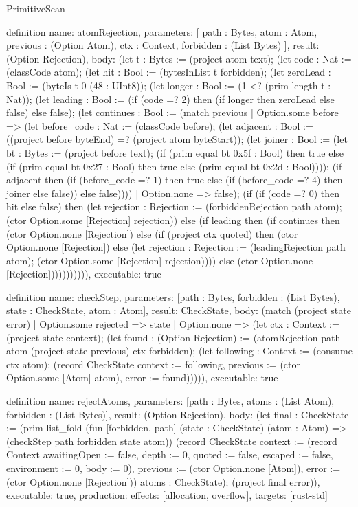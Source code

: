 \begin{lexlean}{PrimitiveScan}
\begin{semanticmodule}
definition{
  name: atomRejection,
  parameters: [
    path : Bytes,
    atom : Atom,
    previous : (Option Atom),
    ctx : Context,
    forbidden : (List Bytes)
  ],
  result: (Option Rejection),
  body: (let t : Bytes := (project atom text); (let code : Nat := (classCode atom); (let hit : Bool := (bytesInList t forbidden); (let zeroLead : Bool := (byteIs t 0 (48 : UInt8)); (let longer : Bool := (1 <? (prim length t : Nat)); (let leading : Bool := (if (code =? 2) then (if longer then zeroLead else false) else false); (let continues : Bool := (match previous
    | Option.some before => (let before_code : Nat := (classCode before); (let adjacent : Bool := ((project before byteEnd) =? (project atom byteStart)); (let joiner : Bool := (let bt : Bytes := (project before text); (if (prim equal bt 0x5f : Bool) then true else (if (prim equal bt 0x27 : Bool) then true else (prim equal bt 0x2d : Bool)))); (if adjacent then (if (before_code =? 1) then true else (if (before_code =? 4) then joiner else false)) else false))))
    | Option.none => false); (if (if (code =? 0) then hit else false) then (let rejection : Rejection := (forbiddenRejection path atom); (ctor Option.some [Rejection] rejection)) else (if leading then (if continues then (ctor Option.none [Rejection]) else (if (project ctx quoted) then (ctor Option.none [Rejection]) else (let rejection : Rejection := (leadingRejection path atom); (ctor Option.some [Rejection] rejection)))) else (ctor Option.none [Rejection])))))))))),
  executable: true
}

definition{
  name: checkStep,
  parameters: [path : Bytes, forbidden : (List Bytes), state : CheckState, atom : Atom],
  result: CheckState,
  body: (match (project state error)
    | Option.some rejected => state
    | Option.none => (let ctx : Context := (project state context); (let found : (Option Rejection) := (atomRejection path atom (project state previous) ctx forbidden); (let following : Context := (consume ctx atom); (record CheckState {context := following, previous := (ctor Option.some [Atom] atom), error := found}))))),
  executable: true
}

definition{
  name: rejectAtoms,
  parameters: [path : Bytes, atoms : (List Atom), forbidden : (List Bytes)],
  result: (Option Rejection),
  body: (let final : CheckState := (prim list_fold (fun [forbidden, path] (state : CheckState) (atom : Atom) => (checkStep path forbidden state atom)) (record CheckState {context := (record Context {awaitingOpen := false, depth := 0, quoted := false, escaped := false, environment := 0, body := 0}), previous := (ctor Option.none [Atom]), error := (ctor Option.none [Rejection])}) atoms : CheckState); (project final error)),
  executable: true,
  production: {effects: [allocation, overflow], targets: [rust-std]}
}
\end{semanticmodule}
\end{lexlean}

